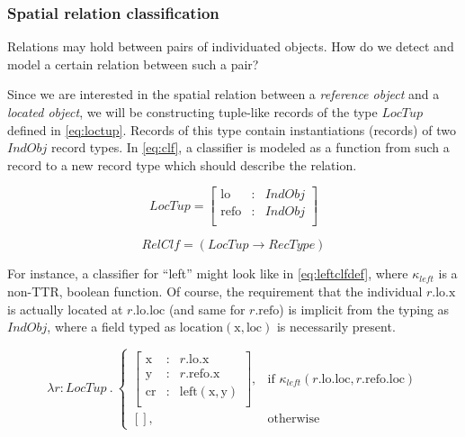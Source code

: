 \subsubsection{Spatial relation classification}

Relations may hold between pairs of individuated objects.
How do we detect and model a certain relation between such a pair?

Since we are interested in the spatial relation between a \textit{reference object} and a \textit{located object}, we will be constructing tuple-like records of the type $LocTup$ defined in \autoref{eq:loctup}.
Records of this type contain instantiations (records) of two $IndObj$ record types.
In \autoref{eq:clf}, a classifier is modeled as a function from such a record to a new record type which should describe the relation.

\begin{equation}\label{eq:loctup}
LocTup = \left[\begin{array}{rcl}
    \text{lo} &:& IndObj \\
    \text{refo} &:& IndObj \\
    \end{array}\right]
\end{equation}

\begin{equation}\label{eq:clf}
RelClf = ( LocTup \rightarrow RecType )
\end{equation}

For instance, a classifier for ``left'' might look like in \autoref{eq:leftclfdef}, where $\kappa_{left}$ is a non-TTR, boolean function.
Of course, the requirement that the individual $r.\text{lo}.\text{x}$ is actually located at $r.\text{lo}.\text{loc}$ (and same for $r.\text{refo}$) is implicit from the typing as $IndObj$, where a field typed as $\text{location}(\text{x}, \text{loc})$ is necessarily present.

\begin{equation}\label{eq:leftclfdef}
\lambda r : LocTup \ .\ 
\begin{cases}
\left[\begin{array}{rcl}
    \text{x} &:& r.\text{lo}.\text{x} \\
    \text{y} &:& r.\text{refo}.\text{x} \\
    \text{cr} &:& \text{left}(\text{x}, \text{y}) \\
\end{array}\right],
& \text{if } \kappa_{left}(r.\text{lo}.\text{loc}, r.\text{refo}.\text{loc}) \\
[], & \text{otherwise}
\end{cases}
\end{equation}



